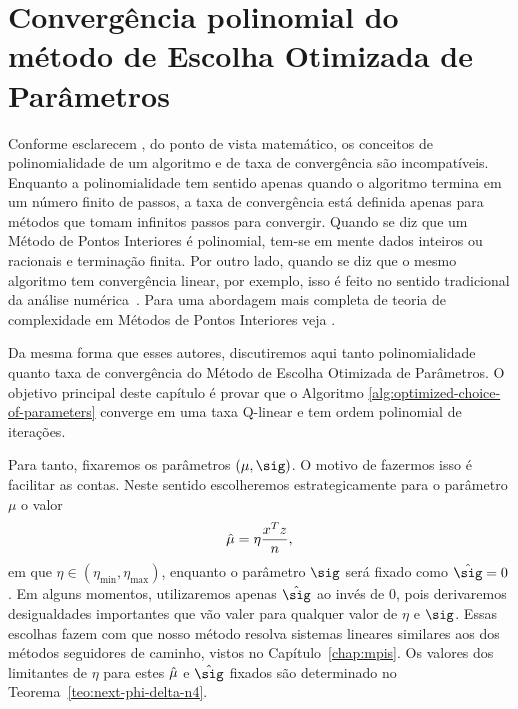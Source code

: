 




\chapter{Convergência  polinomial do método de Escolha Otimizada de Parâmetros}


\label{chap:convergence}


Conforme esclarecem \textcite{Zhang:1993gn}, do ponto de vista matemático, os conceitos de polinomialidade de um algoritmo e de taxa de convergência são incompatíveis. Enquanto a polinomialidade tem sentido apenas quando o algoritmo termina em um número finito de passos, a taxa de convergência  está definida apenas para métodos que tomam infinitos passos para convergir. Quando  se diz que um Método de Pontos Interiores é polinomial, tem-se em mente dados inteiros ou racionais e terminação finita. Por outro lado, quando se diz que o mesmo algoritmo tem convergência linear, por exemplo, isso é feito  no sentido tradicional da análise numérica~\cite{Ortega:2000vd}. Para uma abordagem mais completa de teoria de complexidade em Métodos de Pontos Interiores veja \cite[cap.~3]{Wright:Primal-dual-interior-point:1997h}.

Da mesma forma que esses autores, discutiremos aqui tanto polinomialidade quanto taxa de convergência do Método de Escolha Otimizada de Parâmetros. O objetivo principal  deste capítulo é   provar  que o Algoritmo \ref{alg:optimized-choice-of-parameters} converge em uma taxa Q-linear e tem ordem polinomial de iterações.






 Para tanto,  fixaremos os parâmetros $(\mu,\sig)$. O motivo de fazermos isso é facilitar as contas. Neste sentido escolheremos estrategicamente  para o parâmetro  $\mu$ o valor \[\hat{\mu}=\eta\dfrac{x^Tz}{n},
\] 
em que $\eta\in (\eta_{\min},\eta_{\max} )$, enquanto o parâmetro $\sig$ será fixado como $\nextsig =0 $. Em alguns momentos, utilizaremos apenas $\nextsig$ ao invés de $0$, pois derivaremos desigualdades importantes que vão valer para qualquer valor de $\eta$ e $\sig$. Essas escolhas  fazem com que nosso método resolva  sistemas lineares similares aos dos métodos seguidores de caminho, vistos no Capítulo~\ref{chap:mpis}. Os valores dos limitantes de $\eta$ para  estes $\hat{\mu}$  e $\nextsig$ fixados são determinado no Teorema~\ref{teo:next-phi-delta-n4}.


